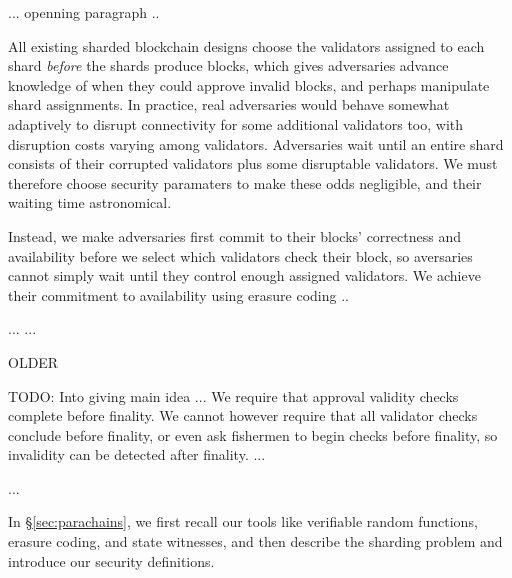 

... openning paragraph ..

All existing sharded blockchain designs choose the validators assigned to each shard {\em before} the shards produce blocks, which gives adversaries advance knowledge of when they could approve invalid blocks, and perhaps manipulate shard assignments.  In practice, real adversaries would behave somewhat adaptively to disrupt connectivity for some additional validators too, with disruption costs varying among validators.  
Adversaries wait until an entire shard consists of their corrupted validators plus some disruptable validators.  We must therefore choose security paramaters to make these odds negligible, and their waiting time astronomical.

Instead, we make adversaries first commit to their blocks' correctness and availability before we select which validators check their block, so aversaries cannot simply wait until they control enough assigned validators.  We achieve their commitment to availability using erasure coding ..

... \cite{FraudProofs} ... 







OLDER



TODO: Into giving main idea
...
We require that approval validity checks complete before finality.  We cannot however require that all validator checks conclude before finality, or even ask fishermen to begin checks before finality, so invalidity can be detected after finality.
...

...

In \S\ref{sec:parachains}, we first recall our tools like verifiable random functions, erasure coding, and state witnesses, and then describe the sharding problem and introduce our security definitions. 

